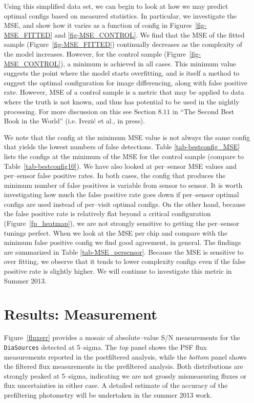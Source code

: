 \documentclass[prd, nofootinbib, floatfix, 11pt,tightenlines,times]{article}
\begin{document}
Using this simplified data set, we can begin to look at how we may predict 
optimal configs based on measured statistics.  In particular, we investigate
the MSE, and show how it varies as a function of config in Figures~\ref{fig-MSE_FITTED} and \ref{fig-MSE_CONTROL}.
We find that the MSE of the fitted sample (Figure~\ref{fig-MSE_FITTED}) continually decreases as the complexity 
of the model increases.  However, for the control sample (Figure~\ref{fig-MSE_CONTROL}), a minimum is achieved in all cases.
This minimum value suggests the point where the model starts overfitting, and is itself a method
to suggest the optimal configuration for image differencing, along with false positive rate.
However, MSE of a control sample is a metric that may be applied to data where the truth is not known, and thus has
potential to be used in the nightly processing.
For more discussion on this see Section $8.11$ in
``The Second Best Book in the World'' (i.e. {Ivezi{\'c} et al., in press}).

We note that the config at the minimum MSE value is
not always the same config that yields the lowest numbers of false detections.  
Table \ref{tab-bestconfig_MSE} lists the configs
at the minimum of the MSE for the control sample (compare to Table~\ref{tab-bestconfig10}).
%
We have also 
looked at per--sensor MSE values and per--sensor false positive rates.  In both cases, 
the config that produces the minimum number of false positives is variable
from sensor to sensor.  It is worth investigating how much the false positive rate
goes down if per--sensor optimal configs are used instead of per--visit optimal
configs.  On the other hand, because the false positive rate is relatively flat beyond a critical 
configuration (Figure~\ref{fp_heatmap}), we are not strongly sensitive to getting the per--sensor
tunings perfect.
%
When we look at the MSE per chip and compare with the minimum false positive config we 
find good agreement, in general.  The findings are summarized in Table \ref{tab-MSE_persensor}.  Because
the MSE is sensitive to over fitting, we observe that it tends to lower complexity configs
even if the false positive rate is slightly higher.  We will continue to investigate this metric
in Summer 2013.

\section{Results: Measurement}

Figure~\ref{fluxerr} provides a mosaic of absolute--value S/N
measurements for the {\tt DiaSources} detected at 5--sigma.  The {\it
  top} panel shows the PSF flux measurements reported in the
postfiltered analysis, while the {\it bottom} panel shows the filtered
flux measurements in the prefiltered analysis.  Both distributions are
strongly peaked at 5--sigma, indicating we are not grossly
mismeasuring fluxes or flux uncertainties in either case. A detailed
estimate of the accuracy of the prefiltering photometry will be
undertaken in the summer 2013 work.
\end{document}
